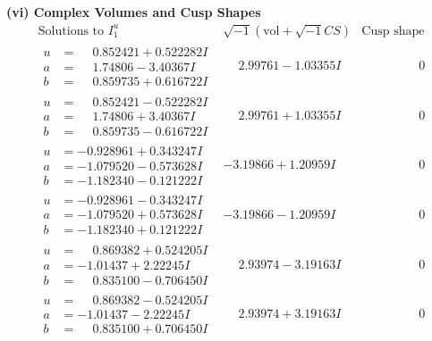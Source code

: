 \documentclass[1p]{elsarticle_modified}
\theoremstyle{definition}
\newcommand{\I}{\sqrt{-1}}
\begin{document}
\newpage\flushleft \textbf{(vi) Complex Volumes and Cusp Shapes}
$$\begin{array}{c|c|c}  
\text{Solutions to }I^u_{1}& \I (\text{vol} + \sqrt{-1}CS) & \text{Cusp shape}\\
 \hline 
\begin{aligned}
u &= \phantom{-}0.852421 + 0.522282 I \\
a &= \phantom{-}1.74806 - 3.40367 I \\
b &= \phantom{-}0.859735 + 0.616722 I\end{aligned}
 & \phantom{-}2.99761 - 1.03355 I & \phantom{-0.000000 } 0 \\ \hline\begin{aligned}
u &= \phantom{-}0.852421 - 0.522282 I \\
a &= \phantom{-}1.74806 + 3.40367 I \\
b &= \phantom{-}0.859735 - 0.616722 I\end{aligned}
 & \phantom{-}2.99761 + 1.03355 I & \phantom{-0.000000 } 0 \\ \hline\begin{aligned}
u &= -0.928961 + 0.343247 I \\
a &= -1.079520 - 0.573628 I \\
b &= -1.182340 - 0.121222 I\end{aligned}
 & -3.19866 + 1.20959 I & \phantom{-0.000000 } 0 \\ \hline\begin{aligned}
u &= -0.928961 - 0.343247 I \\
a &= -1.079520 + 0.573628 I \\
b &= -1.182340 + 0.121222 I\end{aligned}
 & -3.19866 - 1.20959 I & \phantom{-0.000000 } 0 \\ \hline\begin{aligned}
u &= \phantom{-}0.869382 + 0.524205 I \\
a &= -1.01437 + 2.22245 I \\
b &= \phantom{-}0.835100 - 0.706450 I\end{aligned}
 & \phantom{-}2.93974 - 3.19163 I & \phantom{-0.000000 } 0 \\ \hline\begin{aligned}
u &= \phantom{-}0.869382 - 0.524205 I \\
a &= -1.01437 - 2.22245 I \\
b &= \phantom{-}0.835100 + 0.706450 I\end{aligned}
 & \phantom{-}2.93974 + 3.19163 I & \phantom{-0.000000 } 0 \\ \hline\begin{aligned}

\end{aligned}
\end{array}$$
\end{document}
